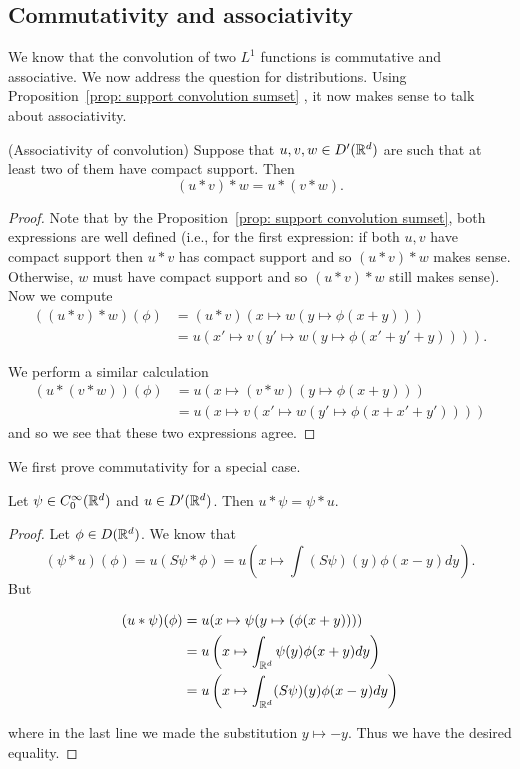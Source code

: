 \documentclass[twoside, a4paper, 10pt]{amsart}
\begin{document}
\subsection{Commutativity and associativity}

We know that the convolution of two $L^1$ functions is commutative and associative. We now address the question for distributions. Using Proposition~\ref{prop: support convolution sumset} , it now makes sense to talk about associativity.

\begin{thm}(Associativity of convolution) Suppose that $u,v,w \in D'(\mathbb{R}^d)$ are such that at least two of them have compact support. Then $$(u * v) * w = u * (v * w).$$

\end{thm}

\begin{proof} Note that by the Proposition~\ref{prop: support convolution sumset}, both expressions are well defined (i.e., for the first expression: if both $u,v$ have compact support then $u*v$ has compact support and so $(u*v)*w$ makes sense. Otherwise, $w$ must have compact support and so $(u*v)*w$ still makes sense). Now we compute  \begin{align*} ((u*v)*w)(\phi) &= (u*v)(x \mapsto w(y \mapsto \phi(x+y))) \\
&= u(x' \mapsto v(y' \mapsto w(y \mapsto \phi(x'+y'+y)))).   \end{align*} 

We perform a similar calculation \begin{align*} (u*(v*w)) (\phi) &= u(x \mapsto (v*w)(y \mapsto \phi(x+y))) \\
&= u (x \mapsto v(x' \mapsto w(y' \mapsto \phi(x+x'+y')))) \end{align*} and so we see that these two expressions agree. \end{proof}

We first prove commutativity for a special case.

\begin{lemma} Let $\psi \in C_0^{\infty}(\mathbb{R}^d)$ and $u \in D'(\mathbb{R}^d)$. Then $u * \psi = \psi * u$.

\end{lemma}

\begin{proof} Let $\phi \in D(\mathbb{R}^d)$. We know that $$(\psi * u)(\phi) = u(S\psi * \phi) = u\left(x \mapsto \int (S\psi)(y) \phi(x-y) dy \right).$$ But 

\begin{align*} (u*\psi)(\phi) &= u(x \mapsto \psi(y \mapsto (\phi(x+y)))) \\ &= u\left( x \mapsto \int_{\mathbb{R}^d} \psi(y)\phi(x+y) dy \right) \\ &= u\left( x \mapsto \int_{\mathbb{R}^d} (S\psi)(y)\phi(x-y) dy \right)  \end{align*} 

where in the last line we made the substitution $y \mapsto -y$. Thus we have the desired equality. \end{proof}
\end{document}
